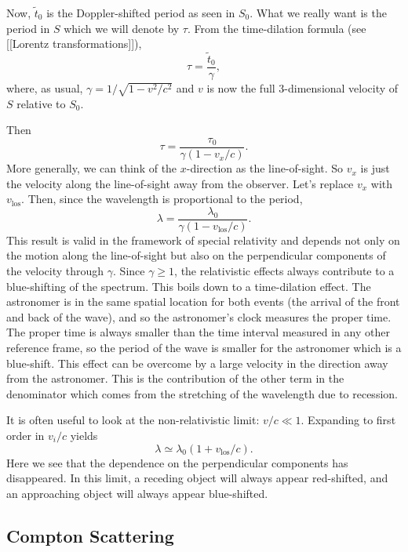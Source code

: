 \documentclass{article}
\begin{document}
Now, $\tilde{t}_0$ is the Doppler-shifted period as seen in $S_0$.  What we really want is the period in $S$ which we will denote by $\tau$.  From the time-dilation formula (see [[Lorentz transformations]]),
\begin{equation}
\tau = \frac{\tilde{t}_0}{\gamma} ,
\end{equation}
where, as usual, $\gamma = 1 / \sqrt{1 - v^2 / c^2}$ and $v$ is now the full 3-dimensional velocity of $S$ relative to $S_0$.

Then
\begin{equation}
\tau = \frac{ \tau_0 }{ \gamma ( 1 - v_x / c) } .
\end{equation}
More generally, we can think of the $x$-direction as the line-of-sight. So $v_x$ is just the velocity along the line-of-sight away from the observer. Let's replace $v_x$ with $v_\mathrm{los}$. Then, since the wavelength is proportional to the period,
\begin{equation}
\lambda = \frac{ \lambda_0 }{ \gamma ( 1 - v_\mathrm{los} / c) } .
\end{equation}
This result is valid in the framework of special relativity and depends not only on the motion along the line-of-sight but also on the perpendicular components of the velocity through $\gamma$. Since $\gamma \geq 1$, the relativistic effects always contribute to a blue-shifting of the spectrum. This boils down to a time-dilation effect. The astronomer is in the same spatial location for both events (the arrival of the front and back of the wave), and so the astronomer's clock measures the proper time. The proper time is always smaller than the time interval measured in any other reference frame, so the period of the wave is smaller for the astronomer which is a blue-shift. This effect can be overcome by a large velocity in the direction away from the astronomer. This is the contribution of the other term in the denominator which comes from the stretching of the wavelength due to recession. 

It is often useful to look at the non-relativistic limit: $v/c \ll 1$.  Expanding to first order in $v_i/c$ yields
\begin{equation}
\lambda \simeq \lambda_0 (1 + v_\mathrm{los}/c) .
\end{equation}
Here we see that the dependence on the perpendicular components has disappeared. In this limit, a receding object will always appear red-shifted, and an approaching object will always appear blue-shifted.

\subsection{Compton Scattering}
\end{document}
